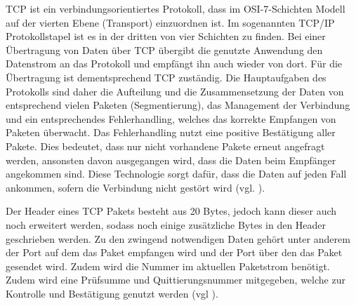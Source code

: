 \ac{TCP} ist ein verbindungsorientiertes Protokoll, dass im \ac{OSI}-7-Schichten Modell auf der vierten Ebene (Transport) einzuordnen ist. Im sogenannten \ac{TCP}/\ac{IP} Protokollstapel ist es in der dritten von vier Schichten zu finden. Bei einer Übertragung von Daten über \ac{TCP} übergibt die genutzte Anwendung den Datenstrom an das Protokoll und empfängt ihn auch wieder von dort. Für die Übertragung ist dementsprechend \ac{TCP} zuständig. 
Die Hauptaufgaben des Protokolls sind daher die Aufteilung und die Zusammensetzung der Daten von entsprechend vielen Paketen (Segmentierung), das Management der Verbindung und ein entsprechendes Fehlerhandling, welches das korrekte Empfangen von Paketen überwacht. Das Fehlerhandling nutzt eine positive Bestätigung aller Pakete. Dies bedeutet, dass nur nicht vorhandene Pakete erneut angefragt werden, ansonsten davon ausgegangen wird, dass die Daten beim Empfänger angekommen sind. Diese Technologie sorgt dafür, dass die Daten auf jeden Fall ankommen, sofern die Verbindung nicht gestört wird (vgl. \cite{.c}\cite{.22.11.2016}).

Der Header eines \ac{TCP} Pakets besteht aus 20 Bytes, jedoch kann dieser auch noch erweitert werden, sodass noch einige zusätzliche Bytes in den Header geschrieben werden. Zu den zwingend notwendigen Daten gehört unter anderem der Port auf dem das Paket empfangen wird und der Port über den das Paket gesendet wird. Zudem wird die Nummer im aktuellen Paketstrom benötigt. Zudem wird eine Prüfsumme und Quittierungsnummer mitgegeben, welche zur Kontrolle und Bestätigung genutzt werden (vgl \cite{.c}).
